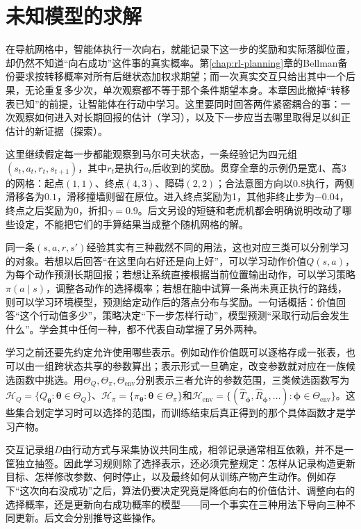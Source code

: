 \chapter{未知模型的求解}
\label{chap:rl-learning}

在导航网格中，智能体执行一次向右，就能记录下这一步的奖励和实际落脚位置，却仍然不知道“向右成功”这件事的真实概率。第\ref{chap:rl-planning}章的Bellman备份要求按转移概率对所有后继状态加权求期望；而一次真实交互只给出其中一个后果，无论重复多少次，单次观察都不等于那个条件期望本身。本章因此撤掉“转移表已知”的前提，让智能体在行动中学习。这里要同时回答两件紧密耦合的事：一次观察如何进入对长期回报的估计（学习），以及下一步应当去哪里取得足以纠正估计的新证据（探索）。

这里继续假定每一步都能观察到马尔可夫状态，一条经验记为四元组
$(s_t,a_t,r_t,s_{t+1})$，其中$r_t$是执行$a_t$后收到的奖励。贯穿全章的示例仍是宽4、高3的网格：起点$(1,1)$、终点$(4,3)$、障碍$(2,2)$；合法意图方向以$0.8$执行，两侧滑移各为$0.1$，滑移撞墙则留在原位。进入终点奖励为1，其他非终止步为$-0.04$，终点之后奖励为0，折扣$\gamma=0.9$。后文另设的短链和老虎机都会明确说明改动了哪些设定，不能把它们的手算结果当成整个随机网格的解。

同一条$(s,a,r,s')$经验其实有三种截然不同的用法，这也对应三类可以分别学习的对象。若想以后回答“在这里向右好还是向上好”，可以学习动作价值$Q(s,a)$，为每个动作预测长期回报；若想让系统直接根据当前位置输出动作，可以学习策略$\pi(a\mid s)$，调整各动作的选择概率；若想在脑中试算一条尚未真正执行的路线，则可以学习环境模型，预测给定动作后的落点分布与奖励。一句话概括：价值回答“这个行动值多少”，策略决定“下一步怎样行动”，模型预测“采取行动后会发生什么”。学会其中任何一种，都不代表自动掌握了另外两种。

学习之前还要先约定允许使用哪些表示。例如动作价值既可以逐格存成一张表，也可以由一组跨状态共享的参数算出；表示形式一旦确定，改变参数就对应在一族候选函数中挑选。用$\Theta_Q,\Theta_\pi,\Theta_{\mathrm{env}}$分别表示三者允许的参数范围，三类候选函数写为$\mathcal H_Q=\{Q_{\bm\theta}:\bm\theta\in\Theta_Q\}$、$\mathcal H_\pi=\{\pi_{\bm\theta}:\bm\theta\in\Theta_\pi\}$和$\mathcal H_{\mathrm{env}}=\{(\widehat T_{\bm\phi},\widehat R_{\bm\phi},\ldots):\bm\phi\in\Theta_{\mathrm{env}}\}$。这些集合划定学习时可以选择的范围，而训练结束后真正得到的那个具体函数才是学习产物。

交互记录组$D$由行动方式与采集协议共同生成，相邻记录通常相互依赖，并不是一筐独立抽签。因此学习规则除了选择表示，还必须完整规定：怎样从记录构造更新目标、怎样修改参数、何时停止，以及最终如何从训练产物产生动作。例如存下“这次向右没成功”之后，算法仍要决定究竟是降低向右的价值估计、调整向右的选择概率，还是更新向右成功概率的模型——同一个事实在三种用法下导向三种不同更新。后文会分别推导这些操作。

